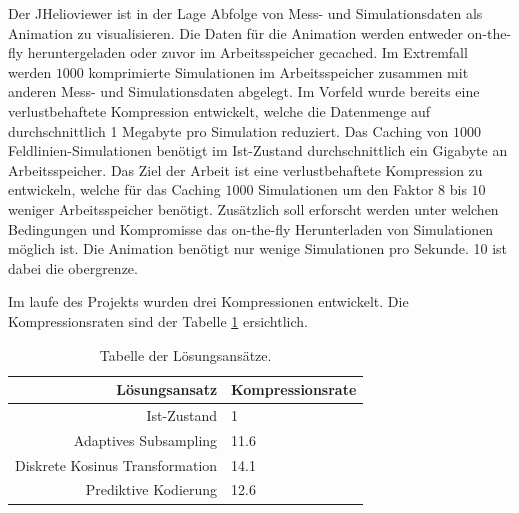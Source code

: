 Der JHelioviewer ist in der Lage Abfolge von Mess- und Simulationsdaten als Animation zu visualisieren. Die Daten für die Animation werden entweder on-the-fly heruntergeladen oder zuvor im Arbeitsspeicher gecached. Im Extremfall werden $1000$ komprimierte Simulationen im Arbeitsspeicher zusammen mit anderen Mess- und Simulationsdaten abgelegt. Im Vorfeld wurde bereits eine verlustbehaftete Kompression entwickelt, welche die Datenmenge auf durchschnittlich 1 Megabyte pro Simulation reduziert. Das Caching von $1000$ Feldlinien-Simulationen benötigt im Ist-Zustand durchschnittlich ein Gigabyte an Arbeitsspeicher. Das Ziel der Arbeit ist eine verlustbehaftete Kompression zu entwickeln, welche für das Caching $1000$ Simulationen um den Faktor $8$ bis $10$ weniger Arbeitsspeicher benötigt.
Zusätzlich soll erforscht werden unter welchen Bedingungen und Kompromisse das on-the-fly Herunterladen von Simulationen möglich ist. Die Animation benötigt nur wenige Simulationen pro Sekunde. 10 ist dabei die obergrenze.

Im laufe des Projekts wurden drei Kompressionen entwickelt. Die Kompressionsraten sind der Tabelle \ref{einleitung:tabelle} ersichtlich.
\begin{table}[!htbp]
	\center
	\begin{tabular}{r|l}
		Lösungsansatz & Kompressionsrate \\\hline
		Ist-Zustand & 1\\
		Adaptives Subsampling & 11.6 \\
		Diskrete Kosinus Transformation & 14.1 \\
		Prediktive Kodierung & 12.6\\
	\end{tabular}
	\caption{Tabelle der Lösungsansätze.}
	\label{einleitung:tabelle}
\end{table}